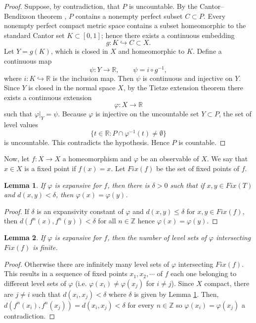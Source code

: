 \documentclass[11pt,letterpaper]{amsart}
\newtheorem{lem}{Lemma}
\begin{document}
\begin{proof}
Suppose, by contradiction, that $P$ is uncountable. 
By the Cantor--Bendixson theorem \cite{k}, $P$ contains a nonempty perfect subset $C\subset P$. 
Every nonempty perfect compact metric space contains a subset homeomorphic to the standard Cantor set $K\subset [0,1]$; hence there exists a continuous embedding 
\[
g:K\hookrightarrow C\subset X.
\]
Let $Y=g(K)$, which is closed in $X$ and homeomorphic to $K$. 
Define a continuous map 
\[
\psi:Y\longrightarrow\mathbb{R}, \qquad 
\psi = i\circ g^{-1},
\]
where $i:K\hookrightarrow\mathbb{R}$ is the inclusion map. 
Then $\psi$ is continuous and injective on $Y$. 
Since $Y$ is closed in the normal space $X$, by the Tietze extension theorem there exists a continuous extension 
\[
\varphi:X\longrightarrow\mathbb{R}
\]
such that $\varphi|_Y = \psi$. 
Because $\varphi$ is injective on the uncountable set $Y\subset P$, the set of level values
\[
\{t\in\mathbb{R} : P\cap \varphi^{-1}(t)\neq\emptyset\}
\]
is uncountable. 
This contradicts the hypothesis. 
Hence $P$ is countable.
\end{proof}


Now, let $f:X\to X$ a
homeomorphism and $\varphi$ be an observable of $X$.
We say that $x\in X$ is a fixed point if $f(x)=x$.
Let $Fix(f)$ be the set of fixed points of $f$.



\begin{lem}
\label{sonriso}
If $\varphi$ is expansive for $f$, then there is $\delta>0$ such that
if $x,y\in Fix(T)$ and $d(x,y)<\delta$, then $\varphi(x)=\varphi(y)$.
\end{lem}

\begin{proof}
If $\delta$ is an expansivity constant of $\varphi$ and $d(x,y)\leq\delta$ for $x,y\in Fix(f)$, then
$d(f^n(x),f^n(y))<\delta$ for all $n\in\mathbb{Z}$ hence $\varphi(x)=\varphi(y)$.
\end{proof}

\begin{lem}
\label{culito}
If $\varphi$ is expansive for $f$, then
the number of level sets of $\varphi$ intersecting $Fix(f)$ is finite.
\end{lem}

\begin{proof}
Otherwise there are infinitely many level sets of $\varphi$ intersecting $Fix(f)$.
This results in a sequence of fixed points $x_1,x_2,\cdots$ of $f$ each one belonging to different level sets of $\varphi$ (i.e. $\varphi(x_i)\neq \varphi(x_j)$ for $i\neq j$).
Since $X$ compact, there are $j\neq i$ such
that $d(x_i,x_j)<\delta$ where $\delta$ is given by Lemma \ref{sonriso}.
Then, $d(f^n(x_i),f^n(x_j))=d(x_i,x_j)<\delta$ for every $n\in\mathbb{Z}$ so $\varphi(x_i)=\varphi(x_j)$ a contradiction.
\end{proof}
\end{document}
